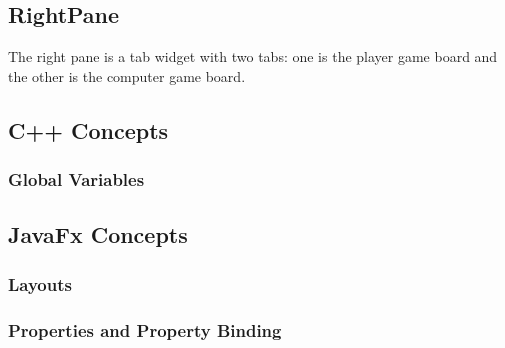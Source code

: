 \subsection {RightPane}

The right pane is a tab widget with two tabs: one is the player game board and the other is the computer game board.

\subsection{C++ Concepts}

\subsubsection{Global Variables} 

\subsection{JavaFx Concepts}

\subsubsection{Layouts}
\subsubsection{Properties and Property Binding}